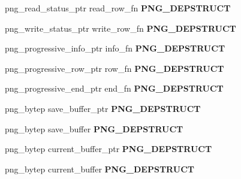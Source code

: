 \begin{DoxyCompactItemize}
\item 
png\+\_\+read\+\_\+status\+\_\+ptr read\+\_\+row\+\_\+fn {\bfseries P\+N\+G\+\_\+\+D\+E\+P\+S\+T\+R\+U\+CT}\hypertarget{structpng__struct__def_a72082606b1b21ba53485ba96aa4caa59}{}\label{structpng__struct__def_a72082606b1b21ba53485ba96aa4caa59}

\item 
png\+\_\+write\+\_\+status\+\_\+ptr write\+\_\+row\+\_\+fn {\bfseries P\+N\+G\+\_\+\+D\+E\+P\+S\+T\+R\+U\+CT}\hypertarget{structpng__struct__def_a2d56ee7ff4dfa3172f47bd041943d01f}{}\label{structpng__struct__def_a2d56ee7ff4dfa3172f47bd041943d01f}

\item 
png\+\_\+progressive\+\_\+info\+\_\+ptr info\+\_\+fn {\bfseries P\+N\+G\+\_\+\+D\+E\+P\+S\+T\+R\+U\+CT}\hypertarget{structpng__struct__def_a401c15143f20f6d09bbabfe7de5e6614}{}\label{structpng__struct__def_a401c15143f20f6d09bbabfe7de5e6614}

\item 
png\+\_\+progressive\+\_\+row\+\_\+ptr row\+\_\+fn {\bfseries P\+N\+G\+\_\+\+D\+E\+P\+S\+T\+R\+U\+CT}\hypertarget{structpng__struct__def_acf9c68733ddde320c69fb5031505b884}{}\label{structpng__struct__def_acf9c68733ddde320c69fb5031505b884}

\item 
png\+\_\+progressive\+\_\+end\+\_\+ptr end\+\_\+fn {\bfseries P\+N\+G\+\_\+\+D\+E\+P\+S\+T\+R\+U\+CT}\hypertarget{structpng__struct__def_a97c8d4cb55c8dfd52d983fc1c0dfea25}{}\label{structpng__struct__def_a97c8d4cb55c8dfd52d983fc1c0dfea25}

\item 
png\+\_\+bytep save\+\_\+buffer\+\_\+ptr {\bfseries P\+N\+G\+\_\+\+D\+E\+P\+S\+T\+R\+U\+CT}\hypertarget{structpng__struct__def_a62b9e3e8adb079f36e2f44650b461747}{}\label{structpng__struct__def_a62b9e3e8adb079f36e2f44650b461747}

\item 
png\+\_\+bytep save\+\_\+buffer {\bfseries P\+N\+G\+\_\+\+D\+E\+P\+S\+T\+R\+U\+CT}\hypertarget{structpng__struct__def_a8103b4daa127e7d94c6236b8eb52a931}{}\label{structpng__struct__def_a8103b4daa127e7d94c6236b8eb52a931}

\item 
png\+\_\+bytep current\+\_\+buffer\+\_\+ptr {\bfseries P\+N\+G\+\_\+\+D\+E\+P\+S\+T\+R\+U\+CT}\hypertarget{structpng__struct__def_a1e5202e3bddd6ed6618a0a401cca38b0}{}\label{structpng__struct__def_a1e5202e3bddd6ed6618a0a401cca38b0}

\item 
png\+\_\+bytep current\+\_\+buffer {\bfseries P\+N\+G\+\_\+\+D\+E\+P\+S\+T\+R\+U\+CT}\hypertarget{structpng__struct__def_a9cbd6d18c89d16e3b8f7378aeb590adf}{}\label{structpng__struct__def_a9cbd6d18c89d16e3b8f7378aeb590adf}


\end{DoxyCompactItemize}
